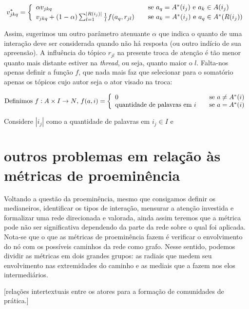 \documentclass{article}
\begin{document}
\begin{equation}
	v_{jkq}^* = \left\{
	\begin{array}{l l}
		\alpha v_{jkq} & \quad \text{se $a_q=A^*(i_j)$ e $a_k \in A(i_j)$} \\
		v_{jkq} + (1-\alpha)\sum_{l=1}^{|R(i_j)|}\frac{1}{l}f(a_q, r_{jl}) & \quad
		\text{se $a_k=A^*(i_j)$ e $a_q \in A^*(R(i_j))$} 
	\end{array}
	\right.
\end{equation}

Assim, sugerimos um outro parâmetro atenuante $\alpha$ que indica o quanto de
uma interação deve ser considerada quando não há resposta (ou outro indício de
sua apreensão). A influência do tópico $r_{jl}$ na presente troca de atenção é
tão menor quanto mais distante estiver na \textit{thread}, ou seja, quanto maior
o $l$. Falta-nos apenas definir a função $f$, que nada mais faz que selecionar
para o somatório apenas os tópicos cujo autor seja o ator visado na troca:

\begin{equation}
		\text{Definimos $f:A\times I\to N$, }
		f(a,i) = \left\{
		\begin{array}{l l}
			0 & \quad \text{se $a\neq A^*(i)$}\\
			\text{quantidade de palavras em }i & \quad \text{se $a=A^*(i)$}
		\end{array}\right.
\end{equation}

Considere $|i_j|$ como a quantidade de palavras em $i_j
\in I$ e
\section{outros problemas em relação às métricas de proeminência}

Voltando a questão da proeminência, mesmo que consigamos definir os medianeiros,
identificar os tipos de interação, mensurar a atenção investida e formalizar uma
rede direcionada e valorada, ainda assim teremos que a métrica pode não ser
significativa dependendo da parte da rede sobre o qual foi aplicada. Nota-se que
o que as métricas de proeminência fazem é verificar o envolvimento do nó com os
possíveis caminhos da rede como grafo. Nesse sentido, podemos dividir as
métricas em dois grandes grupos: as radiais que medem seu envolvimento nas
extremidades do caminho e as mediais que a fazem nos elos intermediários.

[relações intertextuais entre os atores para a formação de comunidades de
prática.]
\end{document}
